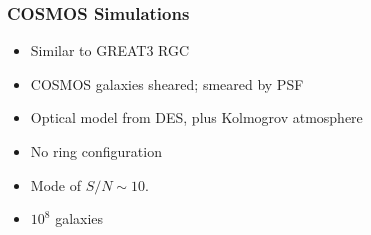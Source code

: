 \documentclass{beamer}
\begin{document}


\frame
{
    \frametitle{COSMOS Simulations}

 
    \begin{itemize}
        \item Similar to {\color{lightskyblue} GREAT3 RGC}

        \item COSMOS galaxies sheared; smeared by PSF

        \item Optical model from DES, plus Kolmogrov atmosphere
        \item {\color{gold} No ring} configuration
        \item Mode of {\color{orange} $S/N \sim 10$}.
        \item $10^8$ galaxies
    \end{itemize}

}
\end{document}
